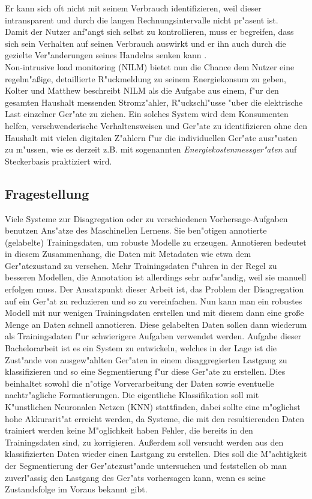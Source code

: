 	Er kann sich oft nicht mit seinem Verbrauch identifizieren, weil dieser intransparent und durch die langen Rechnungsintervalle nicht pr"asent ist. \\
	Damit der Nutzer anf"angt sich selbst zu kontrollieren, muss er begreifen, dass sich sein Verhalten auf seinen Verbrauch auswirkt und er ihn auch durch die gezielte Ver"anderungen seines Handelns senken kann \cite{fischer2008feedback}.\\
	Non-intrusive load monitoring (NILM) bietet nun die Chance dem Nutzer eine regelm"a{\ss}ige, detaillierte R"uckmeldung zu seinem Energiekonsum zu geben, Kolter und Matthew \cite{kolter2011redd} beschreibt NILM als die Aufgabe aus einem, f"ur den gesamten Haushalt messenden Stromz"ahler, R"uckschl"usse "uber die elektrische Last einzelner Ger"ate zu ziehen.
	Ein solches System wird dem Konsumenten helfen, verschwenderische Verhaltensweisen und Ger"ate zu identifizieren ohne den Haushalt mit vielen digitalen Z"ahlern f"ur die individuellen Ger"ate ausr"usten zu m"ussen, wie es derzeit z.B. mit sogenannten \textit{Energiekostenmessger"aten} auf Steckerbasis praktiziert wird.

\subsection{Fragestellung}
\label{Fragestellung}
 	Viele Systeme zur Disagregation oder zu verschiedenen Vorhersage-Aufgaben benutzen Ans"atze des Maschinellen Lernens. Sie ben"otigen annotierte (gelabelte) Trainingsdaten, um robuste Modelle zu erzeugen. Annotieren bedeutet in diesem Zusammenhang, die Daten mit Metadaten wie etwa dem Ger"atezustand zu versehen. Mehr Trainingsdaten f"uhren in der Regel zu besseren Modellen, die Annotation ist allerdings sehr aufw"andig, weil sie manuell erfolgen muss. Der Ansatzpunkt dieser Arbeit ist, das Problem der Disagregation auf ein Ger"at zu reduzieren und so zu vereinfachen. Nun kann man ein robustes Modell mit nur wenigen Trainingsdaten erstellen und mit diesem dann eine gro{\ss}e Menge an Daten schnell annotieren. Diese gelabelten Daten sollen dann wiederum als Trainingsdaten f"ur schwierigere Aufgaben verwendet werden. 
	Aufgabe dieser Bachelorarbeit ist es ein System zu entwickeln, welches in der Lage ist die Zust"ande von ausgew"ahlten Ger"aten in einem disaggregierten Lastgang zu klassifizieren und so eine Segmentierung f"ur diese Ger"ate zu erstellen. Dies beinhaltet sowohl die n"otige Vorverarbeitung der Daten sowie eventuelle nachtr"agliche Formatierungen. Die eigentliche Klassifikation soll mit K"unstlichen Neuronalen Netzen (KNN) stattfinden, dabei sollte eine m"oglichst hohe Akkurarit"at erreicht werden, da Systeme, die mit den resultierenden Daten trainiert werden keine M"oglichkeit haben Fehler, die bereits in den Trainingsdaten sind, zu korrigieren. 
Au{\ss}erdem soll versucht werden aus den klassifizierten Daten wieder einen Lastgang zu erstellen. Dies soll die M"achtigkeit der Segmentierung der Ger"atezust"ande untersuchen und feststellen ob man zuverl"assig den Lastgang des Ger"ats vorhersagen kann, wenn es seine Zustandsfolge im Voraus bekannt gibt. 

